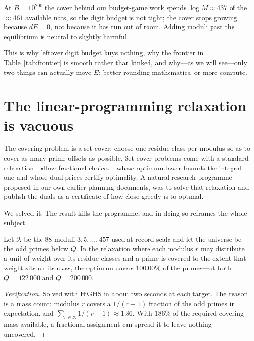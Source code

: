 \begin{observation}\label{obs:equilibrium}
At $B=10^{200}$ the cover behind our budget-game work spends $\log M\approx437$
of the $\approx461$ available nats, so the digit budget is not tight; the cover
stops growing because $dE=0$, not because it has run out of room. Adding moduli
past the equilibrium is neutral to slightly harmful.
\end{observation}

This is why leftover digit budget buys nothing, why the frontier in
Table~\ref{tab:frontier} is smooth rather than kinked, and why---as we will
see---only two things can actually move $E$: better rounding mathematics, or
more compute.

\section{The linear-programming relaxation is vacuous}\label{sec:lp}

The covering problem is a set-cover: choose one residue class per modulus so as
to cover as many prime offsets as possible. Set-cover problems come with a
standard relaxation---allow fractional choices---whose optimum lower-bounds the
integral one and whose dual prices certify optimality. A natural research
programme, proposed in our own earlier planning documents, was to solve that
relaxation and publish the duals as a certificate of how close greedy is to
optimal.

We solved it. The result kills the programme, and in doing so reframes the whole
subject.

\begin{proposition}[LP vacuousness]\label{prop:lp}
Let $\mathcal R$ be the $88$ moduli $3,5,\dots,457$ used at record scale and let
the universe be the odd primes below $Q$. In the relaxation where each modulus
$r$ may distribute a unit of weight over its residue classes and a prime is
covered to the extent that weight sits on its class, the optimum covers
$100.00\%$ of the primes---at both $Q=122\,000$ and $Q=200\,000$.
\end{proposition}
\begin{proof}[Verification]
Solved with HiGHS in about two seconds at each target. The reason is a mass
count: modulus $r$ covers a $1/(r-1)$ fraction of the odd primes in expectation,
and $\sum_{r\in\mathcal R}1/(r-1)\approx1.86$. With $186\%$ of the required
covering mass available, a fractional assignment can spread it to leave nothing
uncovered.
\end{proof}

